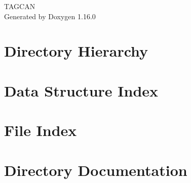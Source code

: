 \documentclass[twoside]{book}
\newcommand{\+}{\discretionary{\mbox{\scriptsize$\hookleftarrow$}}{}{}}
\newcommand{\clearemptydoublepage}{%
    \newpage{\pagestyle{empty}\cleardoublepage}%
  }
\begin{document}
  \raggedbottom
    \hypersetup{pageanchor=false,
                bookmarksnumbered=true,
                pdfencoding=unicode
               }
  \begin{titlepage}
  \vspace*{7cm}
  \begin{center}%
  {\Large TAGCAN}\\
  \vspace*{1cm}
  {\large Generated by Doxygen 1.16.0}\\
  \end{center}
  \end{titlepage}
  \clearemptydoublepage
  \tableofcontents
  \clearemptydoublepage
  \hypersetup{pageanchor=true}






\chapter{Directory Hierarchy}

\chapter{Data Structure Index}

\chapter{File Index}

\chapter{Directory Documentation}









\end{document}
